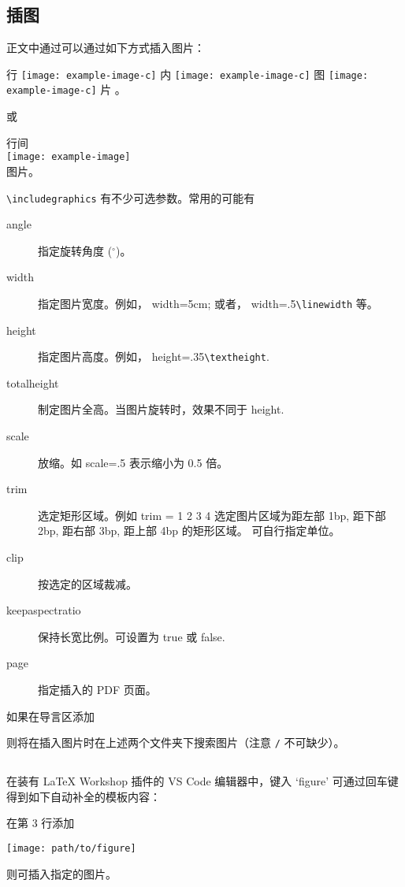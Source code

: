 \subsection{插图}
正文中通过可以通过如下方式插入图片：
\begin{vertlst}
  
行
\texttt{[image: example-image-c]}
内
\texttt{[image: example-image-c]}
图
\texttt{[image: example-image-c]}
片
。
\end{vertlst}
或
\begin{vertlst}
行间 \\
\texttt{[image: example-image]} \\
图片。
\end{vertlst}

\verb+\includegraphics+ 有不少可选参数。常用的可能有
\begin{description}
  \item[angle] 指定旋转角度 ($^\circ$)。
  \item[width] 指定图片宽度。例如， width=5cm; 或者， width=.5\verb+\linewidth+ 等。
  \item[height] 指定图片高度。例如， height=.35\verb+\textheight+.
  \item[totalheight] 制定图片全高。当图片旋转时，效果不同于 height.
  \item[scale] 放缩。如 scale=.5 表示缩小为 0.5 倍。 
  \item[trim] 选定矩形区域。例如 trim = 1 2 3 4 选定图片区域为距左部 1bp, 距下部 2bp, 距右部 3bp, 距上部 4bp 的矩形区域。 可自行指定单位。
  \item[clip] 按选定的区域裁减。
  \item[keepaspectratio] 保持长宽比例。可设置为 true 或 false. 
  \item[page] 指定插入的 PDF 页面。 
\end{description}
如果在导言区添加
\begin{texlst}
\graphicspath{{Demos/}{Images/}}
\end{texlst}
则将在插入图片时在上述两个文件夹下搜索图片（注意 \verb+/+ 不可缺少）。


\subsection[浮动体环境]{}
在装有 LaTeX Workshop 插件的 VS Code 编辑器中，键入 `figure' 可通过回车键得到如下自动补全的模板内容：
\begin{texlst}
\begin{figure}[]
  \centering
  
  \caption{}
  \label{}
\end{figure}
\end{texlst}
在第 3 行添加
\begin{texlst}
\texttt{[image: path/to/figure]}
\end{texlst}
则可插入指定的图片。

